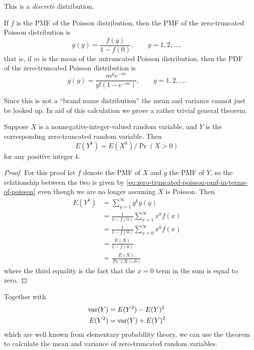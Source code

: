This is a \emph{discrete} distribution.

If $f$ is the PMF of the Poisson distribution, then the PMF of
the zero-truncated Poisson distribution is
\begin{equation} \label{eq:zero-truncated-poisson-pmf-in-terms-of-poisson}
   g(y) = \frac{f(y)}{1 - f(0)}, 
   \qquad y = 1, 2, \ldots,
\end{equation}
that is, if $m$ is the mean of the untruncated Poisson distribution, then
the PDF of the zero-truncated Poisson distribution is
\begin{equation} \label{eq:zero-truncated-poisson-pmf}
   g(y) = \frac{m^y e^{- m}}{y ! (1 - e^{- m})}, 
   \qquad y = 1, 2, \ldots.
\end{equation}

Since this is not a ``brand name distribution'' the mean and variance
cannot just be looked up.  In aid of this calculation we prove a rather
trivial general theorem.
\begin{theorem} \label{th:truncated-mean-variance}
Suppose $X$ is a nonnegative-integer-valued random variable,
and $Y$ is the corresponding zero-truncated random variable.  Then
$$
   E(Y^k) = E(X^k) / \Pr(X > 0)
$$
for any positive integer $k$.
\end{theorem}
\begin{proof}
For this proof let $f$ denote the PMF of $X$ and $g$ the PMF of $Y$, so
the relationship between the two is given
by \eqref{eq:zero-truncated-poisson-pmf-in-terms-of-poisson}
even though we are no longer assuming $X$ is Poisson.  Then
\begin{align*}
   E(Y^k)
   & =
   \sum_{y = 1}^\infty y^k g(y)
   \\
   & =
   \frac{1}{1 - f(0)} \sum_{x = 1}^\infty x^k f(x)
   \\
   & =
   \frac{1}{1 - f(0)} \sum_{x = 0}^\infty x^k f(x)
   \\
   & =
   \frac{E(X)}{1 - f(0)}
   \\
   & =
   \frac{E(X)}{\Pr(X > 0)}
\end{align*}
where the third equality is the fact that the $x = 0$ term in the sum
is equal to zero.
\end{proof}
Together with
\begin{align*}
   \operatorname{var}(Y) & = E(Y^2) - E(Y)^2
   \\
   E(Y^2) & = \operatorname{var}(Y) + E(Y)^2
\end{align*}
which are well known from elementary probability theory, we can use the
theorem to calculate the mean and variance of zero-truncated random variables.

